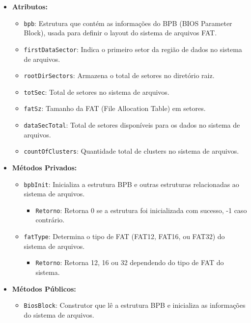 \documentclass[
    12pt,				%
    oneside,   	        %
    a4paper,			%
    english,			%
    french,				%
    spanish,			%
    brazil,				%
    ]{pacotes/abntex2}
\begin{document}
\begin{itemize}
    \item \textbf{Atributos:}
        \begin{itemize}
            \item \texttt{bpb}: Estrutura que contém as informações do BPB (BIOS Parameter Block), usada para definir o layout do sistema de arquivos FAT.
            \item \texttt{firstDataSector}: Indica o primeiro setor da região de dados no sistema de arquivos.
            \item \texttt{rootDirSectors}: Armazena o total de setores no diretório raiz.
            \item \texttt{totSec}: Total de setores no sistema de arquivos.
            \item \texttt{fatSz}: Tamanho da FAT (File Allocation Table) em setores.
            \item \texttt{dataSecTotal}: Total de setores disponíveis para os dados no sistema de arquivos.
            \item \texttt{countOfClusters}: Quantidade total de clusters no sistema de arquivos.
        \end{itemize}
    \item \textbf{Métodos Privados:}
        \begin{itemize}
            \item \texttt{bpbInit}: Inicializa a estrutura BPB e outras estruturas relacionadas ao sistema de arquivos.
            \begin{itemize}
                \item \texttt{Retorno}: Retorna 0 se a estrutura foi inicializada com sucesso, -1 caso contrário.
            \end{itemize}
            \item \texttt{fatType}: Determina o tipo de FAT (FAT12, FAT16, ou FAT32) do sistema de arquivos.
            \begin{itemize}
                \item \texttt{Retorno}: Retorna 12, 16 ou 32 dependendo do tipo de FAT do sistema.
            \end{itemize}
        \end{itemize}
    \item \textbf{Métodos Públicos:}
        \begin{itemize}
            \item \texttt{BiosBlock}: Construtor que lê a estrutura BPB e inicializa as informações do sistema de arquivos.

\end{itemize}
\end{itemize}
\end{document}

